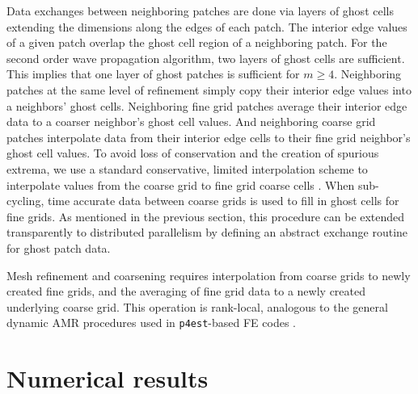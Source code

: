 \documentclass{IOS-Book-Article}     %
\newcommand{\pforest}{\texttt{p4est}\xspace}
\begin{document}
Data exchanges between neighboring patches are done via layers of
ghost cells extending the dimensions along the edges of each patch.
The interior edge values of a given patch overlap the ghost cell
region of a neighboring patch.  For the second order wave propagation
algorithm, two layers of ghost cells are sufficient.  This implies that
one layer of ghost patches is sufficient for $m \ge 4$.  Neighboring
patches at the same level of refinement simply copy their interior
edge values into a neighbors' ghost cells.  Neighboring fine grid
patches average their interior edge data to a coarser neighbor's ghost
cell values.  And neighboring coarse grid patches interpolate data
from their interior edge cells to their fine grid neighbor's ghost
cell values.  To avoid loss of conservation and the creation of
spurious extrema, we use a standard conservative, limited
interpolation scheme to interpolate values from the coarse grid to
fine grid coarse cells \cite{amrclaw, chombo}.  When sub-cycling, time accurate
data between coarse grids is used to fill in ghost cells for fine grids.
As mentioned in the previous section, this procedure can be extended
transparently to distributed parallelism by defining an abstract exchange
routine for ghost patch data.

Mesh refinement and coarsening requires interpolation from coarse grids
to newly created fine grids, and the averaging of fine grid data to a newly
created underlying coarse grid.  This operation is rank-local, analogous to the
general dynamic AMR procedures used in \pforest-based FE codes \cite[Fig.\
4]{BursteddeGhattasStadlerEtAl08}.

\section{Numerical results}
\end{document}
